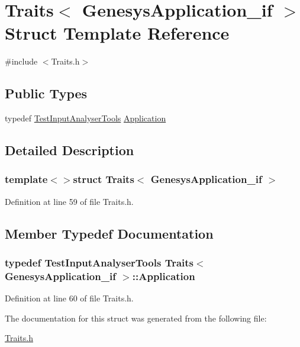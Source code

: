 \hypertarget{struct_traits_3_01_genesys_application__if_01_4}{\section{Traits$<$ Genesys\-Application\-\_\-if $>$ Struct Template Reference}
\label{struct_traits_3_01_genesys_application__if_01_4}
}


{\ttfamily \#include $<$Traits.\-h$>$}

\subsection*{Public Types}
\begin{DoxyCompactItemize}
\item 
typedef \hyperlink{class_test_input_analyser_tools}{Test\-Input\-Analyser\-Tools} \hyperlink{struct_traits_3_01_genesys_application__if_01_4_add1a0522a5561c91605e24d1a7f848cf}{Application}
\end{DoxyCompactItemize}


\subsection{Detailed Description}
\subsubsection*{template$<$$>$struct Traits$<$ Genesys\-Application\-\_\-if $>$}



Definition at line 59 of file Traits.\-h.



\subsection{Member Typedef Documentation}
\hypertarget{struct_traits_3_01_genesys_application__if_01_4_add1a0522a5561c91605e24d1a7f848cf}{
\subsubsection[{Application}]{\setlength{\rightskip}{0pt plus 5cm}typedef {\bf Test\-Input\-Analyser\-Tools} {\bf Traits}$<$ {\bf Genesys\-Application\-\_\-if} $>$\-::{\bf Application}}}\label{struct_traits_3_01_genesys_application__if_01_4_add1a0522a5561c91605e24d1a7f848cf}


Definition at line 60 of file Traits.\-h.



The documentation for this struct was generated from the following file\-:\begin{DoxyCompactItemize}
\item 
\hyperlink{_traits_8h}{Traits.\-h}\end{DoxyCompactItemize}
